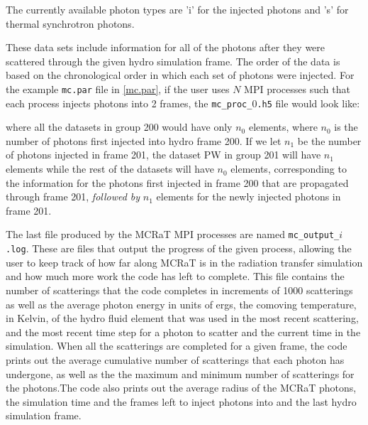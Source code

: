 \documentclass[12pt,a4paper]{article}
\begin{document}
The currently available photon types are 'i' for the injected photons and 's' for thermal synchrotron photons. 

These data sets include information for all of the photons after they were scattered through the given hydro simulation frame. The order of the data is based on the chronological order in which each set of photons were injected. For the example \texttt{mc.par} file in \autoref{mc.par}, if the user uses $N$ MPI processes such that each process injects photons into 2 frames, the \texttt{mc\_proc\_$0$.h5} file would look like:
\begin{figure}[h!]
 \end{figure}
 
\newpage where all the datasets in group 200 would have only $n_{0}$ elements, where $n_{0}$ is the number of photons first injected into hydro frame 200. If we let $n_{1}$ be the number of photons injected in frame 201, the dataset PW in group 201 will have $n_{1}$ elements while the rest of the datasets will have $n_{0}$ elements, corresponding to the information for the photons first injected in frame 200 that are propagated through frame 201, \textit{followed by} $n_{1}$ elements for the newly injected photons in frame 201. 

The last file produced by the MCRaT MPI processes are named \texttt{mc\_output\_$i$.log}. These are files that output the progress of the given process, allowing the user to keep track of how far along MCRaT is in the radiation transfer simulation and how much more work the code has left to complete. This file contains the number of scatterings that the code completes in increments of 1000 scatterings as well as the average photon energy in units of ergs, the comoving temperature, in Kelvin, of the hydro fluid element that was used in the most recent scattering, and the most recent time step for a photon to scatter and the current time in the simulation. When all the scatterings are completed for a given frame, the code prints out the average cumulative number of scatterings that each photon has undergone, as well as the the maximum and minimum number of scatterings for the photons.The code also prints out the average radius of the MCRaT photons, the simulation time and the frames left to inject photons into and the last hydro simulation frame.
\end{document}
